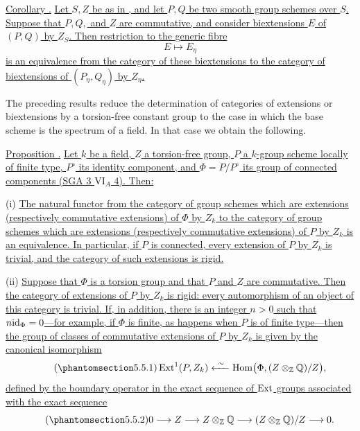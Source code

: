 \medskip
\noindent\underline{Corollary .}  \underline{Let $S,Z$ be as in
, and let $P,Q$ be two smooth group schemes over $S$.  Suppose that
$P,Q,$ and $Z$ are commutative, and consider biextensions $E$ of
$(P,Q)$ by $Z_S$.  Then restriction to the generic fibre}
\[
 E\longmapsto E_\eta
\]
\underline{is an equivalence from the category of these biextensions
to the category of biextensions of $(P_\eta,Q_\eta)$ by $Z_\eta$.}

The preceding results reduce the determination of categories of
extensions or biextensions by a torsion-free constant group to the
case in which the base scheme is the spectrum of a field.  In that
case we obtain the following.

\medskip
\noindent\underline{Proposition .}  \underline{Let $k$ be a field,
$Z$ a torsion-free group, $P$ a $k$-group scheme locally of finite
type, $P^\circ$ its identity component, and
$\Phi=P/P^\circ$ its group of connected components (SGA 3
$\mathrm{VI}_A$ 4).  Then:}

\smallskip
\noindent (i) \underline{The natural functor from the category of group
schemes which are extensions (respectively commutative extensions) of
$\Phi$ by $Z_k$ to the category of group schemes which are extensions
(respectively commutative extensions) of $P$ by $Z_k$ is an
equivalence.  In particular, if $P$ is connected, every extension of
$P$ by $Z_k$ is trivial, and the category of such extensions is
rigid.}

\smallskip
\noindent (ii) \underline{Suppose that $\Phi$ is a torsion group and
that $P$ and $Z$ are commutative.  Then the category of extensions of
$P$ by $Z_k$ is rigid: every automorphism of an object of this
category is trivial.  If, in addition, there is an integer $n>0$ such
that $n\mathrm{id}_\Phi=0$---for example, if $\Phi$ is finite, as happens when
$P$ is of finite type---then the group of classes of commutative
extensions of $P$ by $Z_k$ is given by the canonical isomorphism}
\begin{equation}\tag{\SGARefTarget{sga7.sga7i.eviii.n5-5-1}{5.5.1}}
 \Ext^1(P,Z_k)
 \xleftarrow{\ \sim\ }
 \Hom\bigl(\Phi,(Z\otimes_{\mathbb Z}\mathbb Q)/Z\bigr),
\end{equation}
\underline{defined by the boundary operator in the exact sequence of
$\operatorname{Ext}$ groups associated with the exact sequence}
\begin{equation}\tag{\SGARefTarget{sga7.sga7i.eviii.n5-5-2}{5.5.2}}
 0\longrightarrow Z\longrightarrow Z\otimes_{\mathbb Z}\mathbb Q
 \longrightarrow (Z\otimes_{\mathbb Z}\mathbb Q)/Z
 \longrightarrow 0.
\end{equation}

